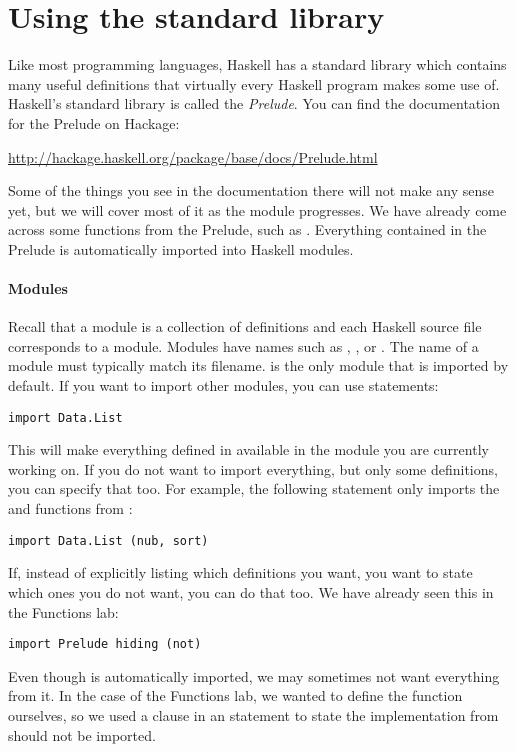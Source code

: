 \section{Using the standard library}

Like most programming languages, Haskell has a standard library which contains many useful definitions that virtually every Haskell program makes some use of. Haskell's standard library is called the \emph{Prelude}. You can find the documentation for the Prelude on Hackage:
\begin{center}\small 
	\url{http://hackage.haskell.org/package/base/docs/Prelude.html}
\end{center}
Some of the things you see in the documentation there will not make any sense yet, but we will cover most of it as the module progresses. We have already come across some functions from the Prelude, such as . Everything contained in the Prelude is automatically imported into Haskell modules.

\paragraph{Modules} Recall that a module is a collection of definitions and each Haskell source file corresponds to a module. Modules have names such as , , or . The name of a module must typically match its filename.  is the only module that is imported by default. If you want to import other modules, you can use  statements:
\begin{verbatim}
import Data.List
\end{verbatim}
This will make everything defined in  available in the module you are currently working on. If you do not want to import everything, but only some definitions, you can specify that too. For example, the following  statement only imports the  and  functions from :
\begin{verbatim}
import Data.List (nub, sort)
\end{verbatim}
If, instead of explicitly listing which definitions you want, you want to state which ones you do not want, you can do that too. We have already seen this in the Functions lab:
\begin{verbatim}
import Prelude hiding (not)
\end{verbatim}
Even though  is automatically imported, we may sometimes not want everything from it. In the case of the Functions lab, we wanted to define the  function ourselves, so we used a  clause in an  statement to state the implementation from  should not be imported. 

